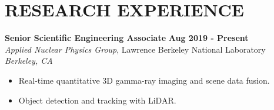 \section{\small{RESEARCH EXPERIENCE}}

\textbf{Senior Scientific Engineering Associate} \hfill \textbf{Aug 2019 - Present} \\
\textsl{Applied Nuclear Physics Group}, Lawrence Berkeley National Laboratory \hfill \textsl{Berkeley, CA} \\[-2.8ex]
\vspace{2pt}
\begin{itemize}[leftmargin=4ex] \itemsep -2pt
    \item Real-time quantitative 3D gamma-ray imaging and scene data fusion.
    \item Object detection and tracking with LiDAR.
\end{itemize}

